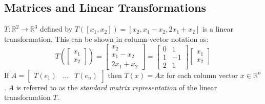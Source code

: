 \documentclass[nobib,notoc]{tufte-handout}
\begin{document}
\subsection{Matrices and Linear Transformations}
\(T:\mathbb{R}^2\rightarrow\mathbb{R}^3\) defined by \(T([x_1,x_2])=[x_2,x_1-x_2,2x_1+x_2]\) is a linear transformation. This can be shown in column-vector notation as:
\begin{equation*}
	T\left(\begin{bmatrix}x_1\\x_2\end{bmatrix}\right)=
		\begin{bmatrix}x_2\\x_1-x_2\\2x_1+x_2\end{bmatrix}=
		\begin{bmatrix}0&1\\1&-1\\2&1\end{bmatrix}
			\begin{bmatrix}x_1\\x_2\end{bmatrix}
\end{equation*}
If \(A=\begin{bmatrix}T(e_1)&\ldots&T(e_n)\end{bmatrix}\) then \(T(x)=Ax\) for each column vector \(x\in\mathbb{R}^n\). \(A\) is referred to as the \emph{standard matrix representation} of the linear transformation \(T\).
\end{document}
